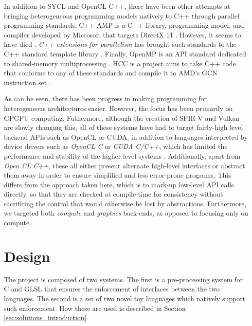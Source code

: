 \documentclass[a4paper,12pt,twoside,openright]{report}
\begin{document}
In addition to SYCL and OpenCL C++, there have been other attempts at bringing
heterogeneous programming models natively to C++ through parallel programming
standards. C++ AMP is a C++ library, programming model, and compiler developed
by Microsoft that targets DirectX 11 \cite{CAMP}. However, it seems to have
died \cite{CAMPFail1} \cite{CAMPFail2}. \textit{C++ extensions for parallelism}
has brought such standards to the C++ standard template library
\cite{CPPParallelism}. Finally, OpenMP is an API standard dedicated to
shared-memory multiprocessing \cite{OpenMP}. HCC is a project aims to take C++
code that conforms to any of these standards and compile it to AMD's GCN
instruction set \cite{HCC}.

As can be seen, there has been progress in making programming for heterogeneous
architectures easier. However, the focus has been primarily on GPGPU computing.
Futhermore, although the creation of SPIR-V and Vulkan are slowly changing
this, all of these systems have had to target fairly-high level backend APIs
such as OpenCL or CUDA, in addition to languages interpreted by device drivers
such as \textit{OpenCL C} or \textit{CUDA C/C++}, which has limited the
performance and stability of the higher-level systems \cite{GLFuzz}.
Additionally, apart from \textit{Open CL C++}, these all either present
alternate high-level interfaces or abstract them away in order to ensure
simplified and less error-prone programs. This differs from the approach taken
here, which is to mark-up low-level API calls directly, so that they are
checked at compile-time for consistency without sacrificing the control that
would otherwise be lost by abstractions. Furthermore, we targeted both
\textit{compute} and \textit{graphics} back-ends, as opposed to focusing only
on compute.



\chapter{Design}

The project is composed of two systems. The first is a pre-processing system for
C and GLSL that ensures the enforcement of interfaces between the two
languages. The second is a set of two novel toy languages which natively
support such enforcement. How these are used is described in Section
\ref{sec:solutions_introduction}
\end{document}
